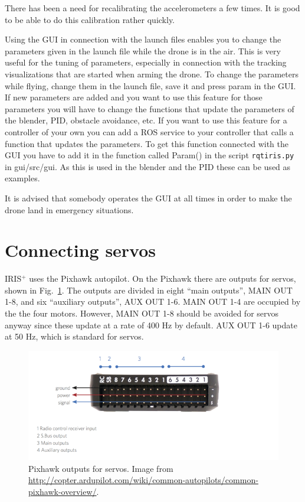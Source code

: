 \documentclass[titlepage,11pt,a4paper]{article}
\begin{document}
There has been a need for recalibrating the accelerometers a few
times. It is good to be able to do this calibration rather quickly.

Using the GUI in connection with the launch files enables you to
change the parameters given in the launch file while the drone is in
the air. This is very useful for the tuning of parameters, especially
in connection with the tracking visualizations that are started when
arming the drone. To change the parameters while flying, change them
in the launch file, save it and press param in the GUI. If new
parameters are added and you want to use this feature for those
parameters you will have to change the functions that update the
parameters of the blender, PID, obstacle avoidance, etc. If you want
to use this feature for a controller of your own you can add a ROS
service to your controller that calls a function that updates the
parameters. To get this function connected with the GUI you have to
add it in the function called Param() in the script
\texttt{rqt\textunderscore iris.py} in gui/src/gui. As this is used in
the blender and the PID these can be used as examples.

It is advised that somebody operates the GUI at all times in order to
make the drone land in emergency situations.


\section{Connecting servos}
\label{sec:servos}
IRIS$^+$ uses the Pixhawk autopilot. On the Pixhawk there are outputs
for servos, shown in Fig.~\ref{fig:pixhawk_outputs}. The outputs are
divided in eight ``main outputs'', MAIN OUT 1-8, and six ``auxiliary
outputs'', AUX OUT 1-6. MAIN OUT 1-4 are occupied by the the four
motors. However, MAIN OUT 1-8 should be avoided for servos anyway
since these update at a rate of 400 Hz by default. AUX OUT 1-6 update
at 50 Hz, which is standard for servos.

\begin{figure}[h!]                                                               
  \centering
  \includegraphics[width=1.0\textwidth]{figures/pixhawk_outputs}
  \caption{Pixhawk outputs for servos. Image from
    \url{http://copter.ardupilot.com/wiki/common-autopilots/common-pixhawk-overview/}.}
  \label{fig:pixhawk_outputs}                                                              
\end{figure}
\end{document}
